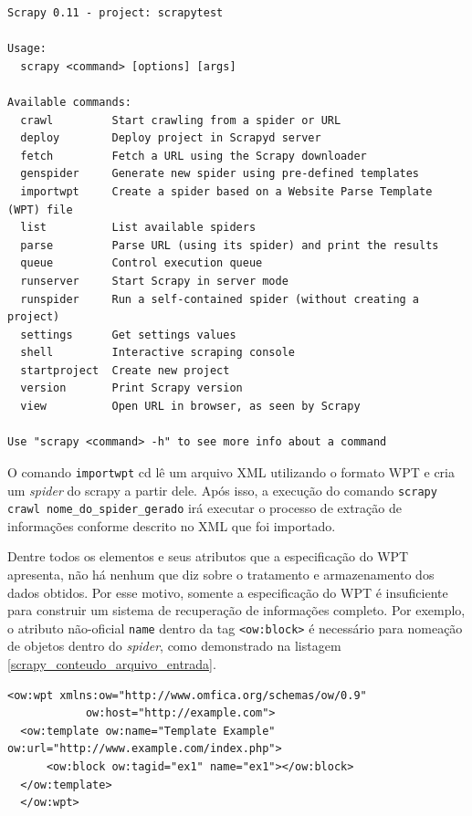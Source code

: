 \pagebreak
{}
\begin{lstlisting}[label=scrapy_comando_pasta_projeto]
Scrapy 0.11 - project: scrapytest

Usage:
  scrapy <command> [options] [args]

Available commands:
  crawl         Start crawling from a spider or URL
  deploy        Deploy project in Scrapyd server
  fetch         Fetch a URL using the Scrapy downloader
  genspider     Generate new spider using pre-defined templates
  importwpt     Create a spider based on a Website Parse Template (WPT) file
  list          List available spiders
  parse         Parse URL (using its spider) and print the results
  queue         Control execution queue
  runserver     Start Scrapy in server mode
  runspider     Run a self-contained spider (without creating a project)
  settings      Get settings values
  shell         Interactive scraping console
  startproject  Create new project
  version       Print Scrapy version
  view          Open URL in browser, as seen by Scrapy

Use "scrapy <command> -h" to see more info about a command

\end{lstlisting}

O comando \texttt{importwpt} cd lê um arquivo XML utilizando o formato WPT e cria um \emph{spider} do scrapy a partir dele. Após isso, a execução do comando \texttt{scrapy crawl nome\_do\_spider\_gerado} irá executar o processo de extração de informações conforme descrito no XML que foi importado.

Dentre todos os elementos e seus atributos que a especificação do WPT apresenta, não há nenhum que diz sobre o tratamento e armazenamento dos dados obtidos. Por esse motivo, somente a especificação do WPT é insuficiente para construir um sistema de recuperação de informações completo. Por exemplo, o atributo não-oficial \texttt{name} dentro da tag \texttt{<ow:block>} é necessário para nomeação de objetos dentro do \emph{spider}, como demonstrado na listagem \ref{scrapy_conteudo_arquivo_entrada}.

\begin{lstlisting}[label=scrapy_conteudo_arquivo_entrada]
  <ow:wpt xmlns:ow="http://www.omfica.org/schemas/ow/0.9"
            ow:host="http://example.com">
  <ow:template ow:name="Template Example" ow:url="http://www.example.com/index.php">
      <ow:block ow:tagid="ex1" name="ex1"></ow:block>
  </ow:template> 
  </ow:wpt>
\end{lstlisting}

